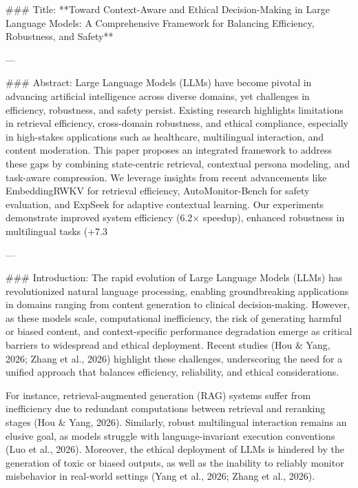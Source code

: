 ### Title:
**Toward Context-Aware and Ethical Decision-Making in Large Language Models: A Comprehensive Framework for Balancing Efficiency, Robustness, and Safety**

---

### Abstract:
Large Language Models (LLMs) have become pivotal in advancing artificial intelligence across diverse domains, yet challenges in efficiency, robustness, and safety persist. Existing research highlights limitations in retrieval efficiency, cross-domain robustness, and ethical compliance, especially in high-stakes applications such as healthcare, multilingual interaction, and content moderation. This paper proposes an integrated framework to address these gaps by combining state-centric retrieval, contextual persona modeling, and task-aware compression. We leverage insights from recent advancements like EmbeddingRWKV for retrieval efficiency, AutoMonitor-Bench for safety evaluation, and ExpSeek for adaptive contextual learning. Our experiments demonstrate improved system efficiency (6.2× speedup), enhanced robustness in multilingual tasks (+7.3%

---

### Introduction:
The rapid evolution of Large Language Models (LLMs) has revolutionized natural language processing, enabling groundbreaking applications in domains ranging from content generation to clinical decision-making. However, as these models scale, computational inefficiency, the risk of generating harmful or biased content, and context-specific performance degradation emerge as critical barriers to widespread and ethical deployment. Recent studies (Hou & Yang, 2026; Zhang et al., 2026) highlight these challenges, underscoring the need for a unified approach that balances efficiency, reliability, and ethical considerations.

For instance, retrieval-augmented generation (RAG) systems suffer from inefficiency due to redundant computations between retrieval and reranking stages (Hou & Yang, 2026). Similarly, robust multilingual interaction remains an elusive goal, as models struggle with language-invariant execution conventions (Luo et al., 2026). Moreover, the ethical deployment of LLMs is hindered by the generation of toxic or biased outputs, as well as the inability to reliably monitor misbehavior in real-world settings (Yang et al., 2026; Zhang et al., 2026).

